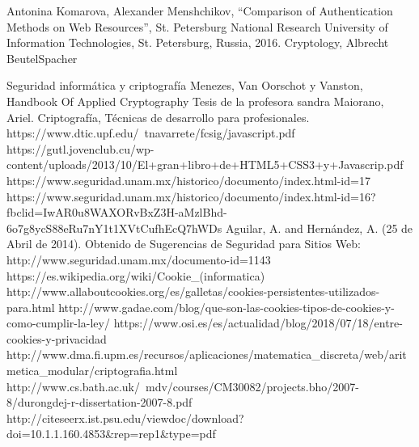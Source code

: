 \documentclass[12pt, a4paper, titlepage]{report}
\begin{document}
	\newpage
    \begin{thebibliography}{20}
	     Antonina Komarova, Alexander Menshchikov, “Comparison of Authentication Methods on Web Resources”, St. Petersburg National Research University of Information Technologies, St. Petersburg, Russia, 2016.
		 Cryptology, Albrecht BeutelSpacher
        
         Seguridad informática y criptografía
         Menezes, Van Oorschot y Vanston, Handbook Of Applied Cryptography
         Tesis de la profesora sandra
         Maiorano, Ariel. Criptografía, Técnicas de desarrollo para profesionales.
		 https://www.dtic.upf.edu/~tnavarrete/fcsig/javascript.pdf 
		 https://gutl.jovenclub.cu/wp-content/uploads/2013/10/El+gran+libro+de+HTML5+CSS3+y+Javascrip.pdf
		 https://www.seguridad.unam.mx/historico/documento/index.html-id=17
		https://www.seguridad.unam.mx/historico/documento/index.html-id=16?fbclid=IwAR0u8WAXORvBxZ3H-aMzlBhd-6o7g8ycS88eRu7nY1t1XVtCufhEcQ7hWDs
		 Aguilar, A. and Hernández, A. (25 de Abril de 2014). Obtenido de Sugerencias de Seguridad para Sitios Web: http://www.seguridad.unam.mx/documento-id=1143
		https://es.wikipedia.org/wiki/Cookie\_(informatica)
		http://www.allaboutcookies.org/es/galletas/cookies-persistentes-utilizados-para.html
		http://www.gadae.com/blog/que-son-las-cookies-tipos-de-cookies-y-como-cumplir-la-ley/
		https://www.osi.es/es/actualidad/blog/2018/07/18/entre-cookies-y-privacidad
		http://www.dma.fi.upm.es/recursos/aplicaciones/matematica\_discreta/web/aritmetica\_modular/criptografia.html
		http://www.cs.bath.ac.uk/~mdv/courses/CM30082/projects.bho/2007-8/durongdej-r-dissertation-2007-8.pdf
		http://citeseerx.ist.psu.edu/viewdoc/download?doi=10.1.1.160.4853\&rep=rep1\&type=pdf

\end{thebibliography}
\end{document}
